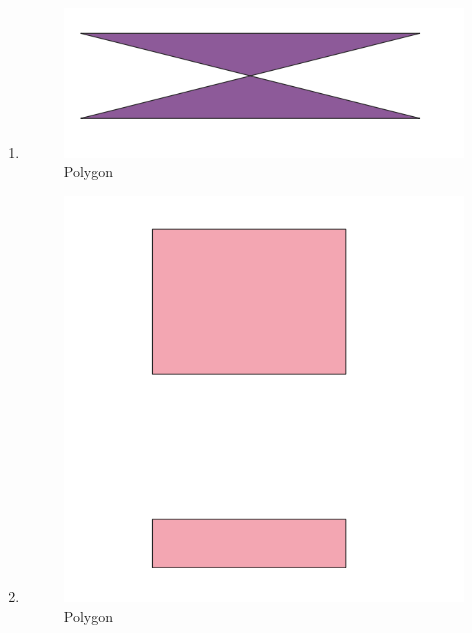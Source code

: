 \begin{enumerate}
	\item 
	
	\begin{figure}[H]
		\includegraphics[width=12cm]{figures/1174040/Python1/Soal8.PNG}
		\centering
		\caption{Polygon}
	\end{figure}
	
	\item 
	
	\begin{figure}[H]
		\includegraphics[width=12cm]{figures/1174040/Python1/Soal9.PNG}
		\centering
		\caption{Polygon}
	\end{figure}


\end{enumerate}
